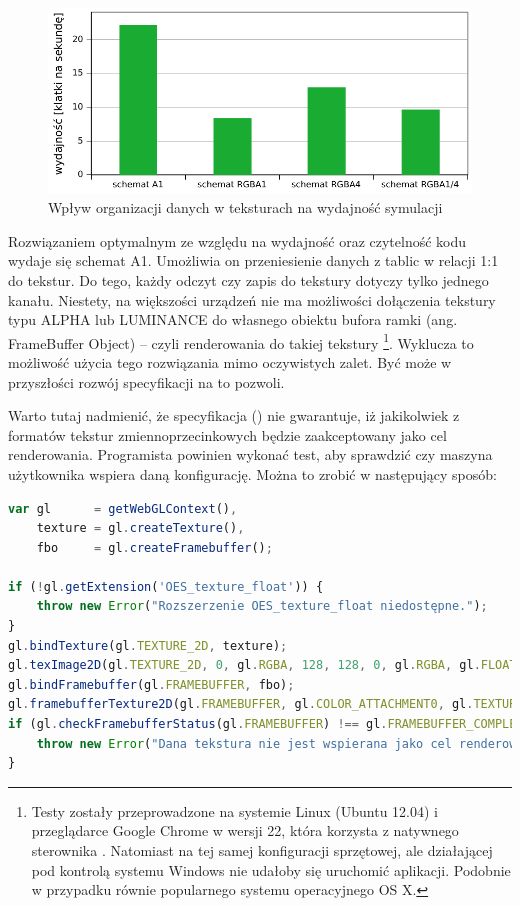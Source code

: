 \begin{figure}[!h]
\centering
\includegraphics[width=.9\textwidth]{img/texPerf}
\caption{Wpływ organizacji danych w teksturach na wydajność symulacji 
}
\label{fig:texPerf}
\end{figure}

Rozwiązaniem optymalnym ze względu na wydajność oraz czytelność kodu wydaje się
schemat A1. Umożliwia on przeniesienie danych z tablic w relacji 1:1 do tekstur.
Do tego, każdy odczyt czy zapis do tekstury dotyczy tylko jednego kanału.
Niestety, na większości urządzeń nie ma możliwości dołączenia tekstury typu
ALPHA lub LUMINANCE do własnego obiektu bufora ramki (ang. FrameBuffer Object)
-- czyli renderowania do takiej tekstury \footnote{Testy zostały przeprowadzone
na systemie Linux (Ubuntu 12.04) i przeglądarce Google Chrome w wersji 22, która
korzysta z natywnego sterownika . Natomiast na tej samej konfiguracji
sprzętowej, ale działającej pod kontrolą systemu Windows nie udałoby się
uruchomić aplikacji. Podobnie w przypadku równie popularnego systemu
operacyjnego OS X.}. Wyklucza to możliwość użycia tego rozwiązania mimo
oczywistych zalet. Być może w przyszłości rozwój specyfikacji  na to
pozwoli.

Warto tutaj nadmienić, że specyfikacja  (\cite{WebGLSpec}) nie
gwarantuje, iż jakikolwiek z formatów tekstur zmiennoprzecinkowych będzie
zaakceptowany jako cel renderowania. Programista powinien wykonać test, aby
sprawdzić czy maszyna użytkownika wspiera daną konfigurację. Można to zrobić w
następujący sposób:

\begin{lstlisting}[language=JavaScript, caption=Weryfikacja poprawności formatu
i typu tekstury używanej jako cel renderowania]
var gl 		= getWebGLContext(),
	texture = gl.createTexture(),
	fbo 	= gl.createFramebuffer();

if (!gl.getExtension('OES_texture_float')) {
	throw new Error("Rozszerzenie OES_texture_float niedostępne.");
}
gl.bindTexture(gl.TEXTURE_2D, texture);
gl.texImage2D(gl.TEXTURE_2D, 0, gl.RGBA, 128, 128, 0, gl.RGBA, gl.FLOAT, null);
gl.bindFramebuffer(gl.FRAMEBUFFER, fbo);
gl.framebufferTexture2D(gl.FRAMEBUFFER, gl.COLOR_ATTACHMENT0, gl.TEXTURE_2D, texture, 0);
if (gl.checkFramebufferStatus(gl.FRAMEBUFFER) !== gl.FRAMEBUFFER_COMPLETE) {
	throw new Error("Dana tekstura nie jest wspierana jako cel renderowania.");
}
\end{lstlisting}

